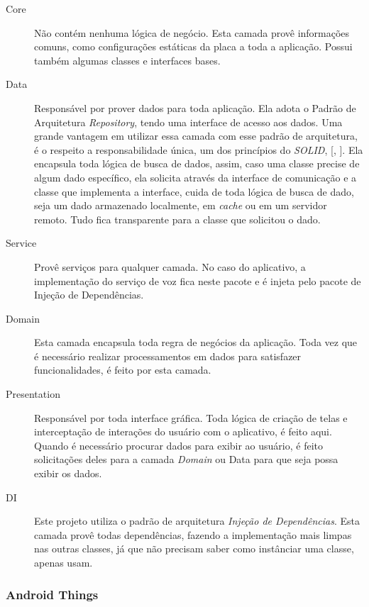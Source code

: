 \documentclass[
	12pt,				%
	oneside,			%
	a4paper,			%
	brazil				%
]{abntex2}
\newcommand{\citecustom}[1]{[\citeauthoronline{#1}, \citeyear{#1}]}
\begin{document}
\begin{description}

\item[Core] Não contém nenhuma lógica de negócio. Esta camada provê informações comuns, como configurações estáticas da placa a toda a aplicação. Possui também algumas classes e interfaces bases.

\item[Data] Responsável por prover dados para toda aplicação. Ela adota o Padrão de Arquitetura \textit{Repository}, tendo uma interface de acesso aos dados. Uma grande vantagem em utilizar essa camada com esse padrão de arquitetura, é o respeito a responsabilidade única, um dos princípios do \textit{SOLID}, \citecustom{solid}. Ela encapsula toda lógica de busca de dados, assim, caso uma classe precise de algum dado específico, ela solicita através da interface de comunicação e a classe que implementa a interface, cuida de toda lógica de busca de dado, seja um dado armazenado localmente, em \textit{cache} ou em um servidor remoto. Tudo fica transparente para a classe que solicitou o dado.

\item[Service] Provê serviços para qualquer camada. No caso do aplicativo, a implementação do serviço de voz fica neste pacote e é injeta pelo pacote de Injeção de Dependências.

\item[Domain] Esta camada encapsula toda regra de negócios da aplicação. Toda vez que é necessário realizar processamentos em dados para satisfazer funcionalidades, é feito por esta camada.

\item[Presentation] Responsável por toda interface gráfica. Toda lógica de criação de telas e interceptação de interações do usuário com o aplicativo, é feito aqui. Quando é necessário procurar dados para exibir ao usuário, é feito solicitações deles para a camada \textit{Domain} ou Data para que seja possa exibir os dados.

\item[DI] Este projeto utiliza o padrão de arquitetura \textit{Injeção de Dependências}. Esta camada provê todas dependências, fazendo a implementação mais limpas nas outras classes, já que não precisam saber como instânciar uma classe, apenas usam.
 
\end{description}

\subsubsection{Android Things}
\end{document}
